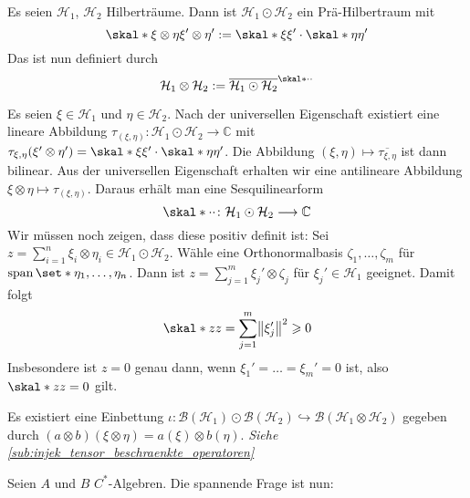 \begin{definitionP}[{name=[{Tensorprodukt von Hilberträumen}]}]
	Es seien $\mathcal{H}_1$, $\mathcal{H}_2$ Hilberträume.
	Dann ist $\mathcal{H}_1 \odot \mathcal{H}_2$ ein Prä-Hilbertraum mit
	\[
		\skal*{\xi \otimes \eta}{\xi' \otimes \eta'} := \skal*{\xi}{\xi'} \cdot \skal*{\eta}{\eta'} 
	\]
	Das  ist nun definiert durch
	\[
		\mathcal{H}_1 \otimes \mathcal{H}_2 := \overline{\mathcal{H}_1 \odot \mathcal{H}_2}^{\skal*{\cdot}{\cdot}}
	\]
\end{definitionP}
\begin{beweis}
	Es seien $\xi \in \mathcal{H}_1$ und $\eta \in \mathcal{H}_2$.
	Nach der universellen Eigenschaft existiert eine lineare Abbildung $\tau_{(\xi,\eta)} \colon \mathcal{H}_1 \odot \mathcal{H}_2 \to \mathbb{C}$ mit $\tau_{{\xi,\eta}} \enbrace*{\xi' \otimes \eta'} = \skal*{\xi}{\xi'} \cdot \skal*{\eta}{\eta'}$.
	Die Abbildung $(\xi,\eta) \mapsto \overline{\tau_{{\xi,\eta}}}$ ist dann bilinear.
	Aus der universellen Eigenschaft erhalten wir eine antilineare Abbildung $\xi \otimes \eta \mapsto \tau_{(\xi,\eta)}$.
	Daraus erhält man eine Sesquilinearform 
	\[
		\skal*{\cdot}{\cdot } \colon \mathcal{H}_1 \odot \mathcal{H}_2 \longrightarrow \mathbb{C}
	\]
	Wir müssen noch zeigen, dass diese positiv definit ist:
	Sei $z = \sum_{i=1}^{n} \xi_i \otimes \eta_i \in \mathcal{H}_1 \odot \mathcal{H}_2$.
	Wähle eine Orthonormalbasis $\zeta_1, \ldots , \zeta_m$ für $\Span \set*{\eta_1, \ldots,\eta_n}$.
	Dann ist $z=\sum_{j=1}^{m} \xi_j' \otimes \zeta_j$ für $\xi_j' \in \mathcal{H}_1$ geeignet.
	Damit folgt 
	\[
		\skal*{z}{z} = \sum_{j=1}^{m} \norm*{\xi'_j}^2 \ge 0
	\]
	Insbesondere ist $z=0$ genau dann, wenn $\xi_1' = \ldots = \xi_m'=0$ ist, also $\skal*{z}{z}=0$ gilt.
\end{beweis}

\begin{bemerkung}[{name=[{Einbettung der Tensorprodukte beschränkter Operatoren}]},label=bem:16]
	Es existiert eine Einbettung $\iota \colon \mathcal{B}(\mathcal{H}_1) \odot \mathcal{B}(\mathcal{H}_2) \hookrightarrow \mathcal{B}(\mathcal{H}_1 \otimes \mathcal{H}_2)$ gegeben durch $(a \otimes b)(\xi \otimes \eta) = a(\xi) \otimes b (\eta)$. \emph{Siehe \cref{sub:injek_tensor_beschraenkte_operatoren}}
\end{bemerkung}

\begin{frageA}[{name=[{C*-Normen auf dem algebraischen Tensorprodukt}]}]
	Seien $A$ und $B$ $C^*$-Algebren.
	Die spannende Frage ist nun:
	\begin{center}
	\end{center}
\end{frageA}


